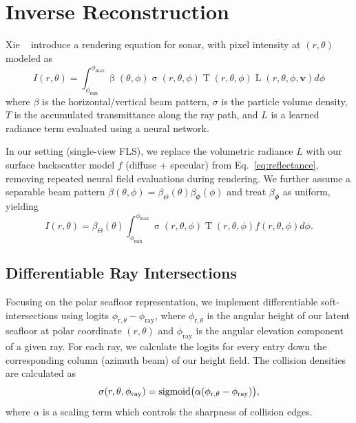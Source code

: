 \section{Inverse Reconstruction}
\label{sec:inverse-reconstruction}
Xie \etal~\cite{Xie2024BathymetryFLSDiff} introduce a rendering equation for sonar, with pixel intensity at \((r,\theta)\) modeled as
\begin{equation}
I(r, \theta) = \int_{\phi_{\text{min}}}^{\phi_{\text{max}}} \operatorname{\beta}(\theta, \phi) \operatorname{\sigma}(r, \theta, \phi) \operatorname{T}(r, \theta, \phi)  \operatorname{L}(r, \theta, \phi, \boldsymbol{v}) d \phi
\end{equation}
where \(\beta\) is the horizontal/vertical beam pattern, \(\sigma\) is the particle volume density, \(T\) is the accumulated transmittance along the ray path, and \(L\) is a learned radiance term evaluated using a neural network. 

In our setting (single-view FLS), we replace the volumetric radiance \(L\) with our surface backscatter model \(f\) (diffuse + specular) from Eq.~\ref{eq:reflectance}, removing repeated neural field evaluations during rendering. We further assume a separable beam pattern \(\beta(\theta,\phi)=\beta_\Theta(\theta)\beta_\Phi(\phi)\) and treat \(\beta_\Phi\) as uniform, yielding
\begin{equation}
I(r, \theta) = \beta_\Theta(\theta) \int_{\phi_{\text{min}}}^{\phi_{\text{max}}}  \operatorname{\sigma}(r, \theta, \phi) \operatorname{T}(r, \theta, \phi)  {f}(r, \theta, \phi) d \phi.
\end{equation}


\subsection{Differentiable Ray Intersections}
\label{sec:differentiable_intersections}
Focusing on the polar seafloor representation, we implement differentiable soft-intersections using logits $\phi_{\text{r},\theta}-\phi_\text{ray}$, where \(\phi_{\text{r},\theta}\) is the angular height of our latent seafloor at polar coordinate \((r, \theta)\) and \(\phi_\text{ray}\) is the angular elevation component of a given ray. For each ray, we calculate the logits for every entry down the corresponding column (azimuth beam) of our height field. The collision densities are calculated as
\begin{equation}
\sigma(r,\theta,\phi_\text{ray})=\operatorname{sigmoid}\!\big(\alpha(\phi_{\text{r},\theta}-\phi_{\text{ray}})\big),
\end{equation}
where \(\alpha\) is a scaling term which controls the sharpness of collision edges. 

